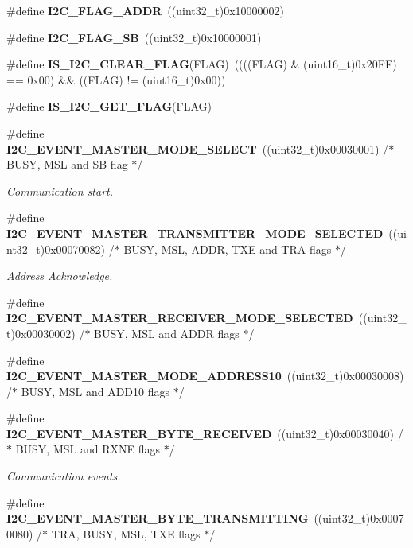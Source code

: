 \begin{DoxyCompactItemize}
\item 
\#define \textbf{ I2\+C\+\_\+\+F\+L\+A\+G\+\_\+\+A\+D\+DR}~((uint32\+\_\+t)0x10000002)
\item 
\#define \textbf{ I2\+C\+\_\+\+F\+L\+A\+G\+\_\+\+SB}~((uint32\+\_\+t)0x10000001)
\item 
\#define \textbf{ I\+S\+\_\+\+I2\+C\+\_\+\+C\+L\+E\+A\+R\+\_\+\+F\+L\+AG}(F\+L\+AG)~((((F\+L\+AG) \& (uint16\+\_\+t)0x20\+F\+F) == 0x00) \&\& ((\+F\+L\+A\+G) != (uint16\+\_\+t)0x00))
\item 
\#define \textbf{ I\+S\+\_\+\+I2\+C\+\_\+\+G\+E\+T\+\_\+\+F\+L\+AG}(F\+L\+AG)
\item 
\#define \textbf{ I2\+C\+\_\+\+E\+V\+E\+N\+T\+\_\+\+M\+A\+S\+T\+E\+R\+\_\+\+M\+O\+D\+E\+\_\+\+S\+E\+L\+E\+CT}~((uint32\+\_\+t)0x00030001)  /$\ast$ B\+U\+S\+Y, M\+S\+L and S\+B flag $\ast$/
\begin{DoxyCompactList}\small\item\em Communication start. \end{DoxyCompactList}\item 
\#define \textbf{ I2\+C\+\_\+\+E\+V\+E\+N\+T\+\_\+\+M\+A\+S\+T\+E\+R\+\_\+\+T\+R\+A\+N\+S\+M\+I\+T\+T\+E\+R\+\_\+\+M\+O\+D\+E\+\_\+\+S\+E\+L\+E\+C\+T\+ED}~((uint32\+\_\+t)0x00070082)  /$\ast$ B\+U\+S\+Y, M\+S\+L, A\+D\+D\+R, T\+X\+E and T\+R\+A flags $\ast$/
\begin{DoxyCompactList}\small\item\em Address Acknowledge. \end{DoxyCompactList}\item 
\#define \textbf{ I2\+C\+\_\+\+E\+V\+E\+N\+T\+\_\+\+M\+A\+S\+T\+E\+R\+\_\+\+R\+E\+C\+E\+I\+V\+E\+R\+\_\+\+M\+O\+D\+E\+\_\+\+S\+E\+L\+E\+C\+T\+ED}~((uint32\+\_\+t)0x00030002)  /$\ast$ B\+U\+S\+Y, M\+S\+L and A\+D\+D\+R flags $\ast$/
\item 
\#define \textbf{ I2\+C\+\_\+\+E\+V\+E\+N\+T\+\_\+\+M\+A\+S\+T\+E\+R\+\_\+\+M\+O\+D\+E\+\_\+\+A\+D\+D\+R\+E\+S\+S10}~((uint32\+\_\+t)0x00030008)  /$\ast$ B\+U\+S\+Y, M\+S\+L and A\+D\+D10 flags $\ast$/
\item 
\#define \textbf{ I2\+C\+\_\+\+E\+V\+E\+N\+T\+\_\+\+M\+A\+S\+T\+E\+R\+\_\+\+B\+Y\+T\+E\+\_\+\+R\+E\+C\+E\+I\+V\+ED}~((uint32\+\_\+t)0x00030040)  /$\ast$ B\+U\+S\+Y, M\+S\+L and R\+X\+N\+E flags $\ast$/
\begin{DoxyCompactList}\small\item\em Communication events. \end{DoxyCompactList}\item 
\#define \textbf{ I2\+C\+\_\+\+E\+V\+E\+N\+T\+\_\+\+M\+A\+S\+T\+E\+R\+\_\+\+B\+Y\+T\+E\+\_\+\+T\+R\+A\+N\+S\+M\+I\+T\+T\+I\+NG}~((uint32\+\_\+t)0x00070080) /$\ast$ T\+R\+A, B\+U\+S\+Y, M\+S\+L, T\+X\+E flags $\ast$/

\end{DoxyCompactItemize}
